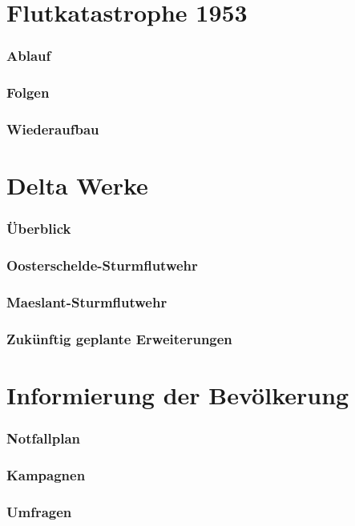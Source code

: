 

\part{Flutkatastrophe 1953}
\section{Ablauf}
\newpage
\section{Folgen}
\newpage
\section{Wiederaufbau}
\newpage

\part{Delta Werke}
\section{Überblick}
\newpage
\section{Oosterschelde-Sturmflutwehr}
\newpage
\section{Maeslant-Sturmflutwehr}
\newpage
\section{Zukünftig geplante Erweiterungen}
\newpage

\part{Informierung der Bevölkerung}
\section{Notfallplan}

\section{Kampagnen} 
\newpage
\section{Umfragen}

